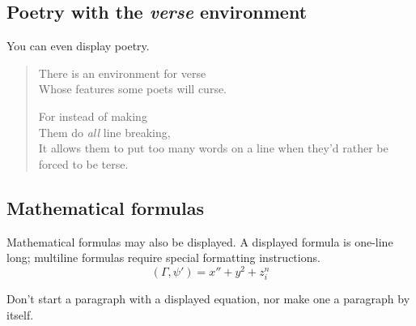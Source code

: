 \documentclass{article}      %
\newcommand{\ip}[2]{(#1, #2)}
\begin{document}
\subsection{Poetry with the \emph{verse} environment}

You can even display poetry.

\begin{verse}
   There is an environment for verse \\             %
   Whose features some poets will curse.


   For instead of making\\
   Them do \emph{all} line breaking, \\
   It allows them to put too many words on a line when they'd rather be forced to be terse.
\end{verse}

\subsection{Mathematical formulas}

Mathematical formulas may also be displayed.  A displayed formula is one-line long; multiline
formulas require special formatting instructions.
   \[  \ip{\Gamma}{\psi'} = x'' + y^{2} + z_{i}^{n}\]

Don't start a paragraph with a displayed equation, nor make one a paragraph by itself.

\end{document}
